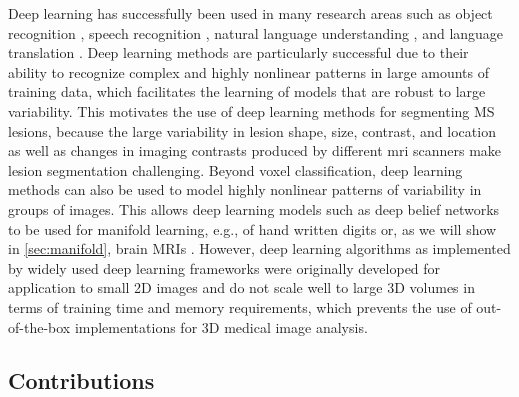 Deep learning has successfully been used in many research areas such as object
recognition \citep{krizhevsky2012}, speech recognition \citep{hinton2012deep},
natural language understanding \citep{collobert2011natural}, and language
translation \citep{sutskever2014sequence}. Deep learning methods are
particularly successful due to their ability to recognize complex and highly
nonlinear patterns in large amounts of training data, which facilitates the
learning of models that are robust to large variability. This motivates the use
of deep learning methods for segmenting MS lesions, because the large
variability in lesion shape, size, contrast, and location as well as changes in
imaging contrasts produced by different \gls{mri} scanners make lesion
segmentation challenging. Beyond voxel classification, deep learning methods can
also be used to model highly nonlinear patterns of variability in groups of
images. This allows deep learning models such as deep belief networks to be used
for manifold learning, e.g., of hand written digits \citep{hinton2006b} or, as
we will show in \ref{sec:manifold}, brain MRIs \citep{brosch2013}. However,
deep learning algorithms as implemented by widely used deep learning frameworks
were originally developed for application to small 2D images and do not scale
well to large 3D volumes in terms of training time and memory requirements,
which prevents the use of out-of-the-box implementations for 3D medical image
analysis.

\subsection{Contributions}

